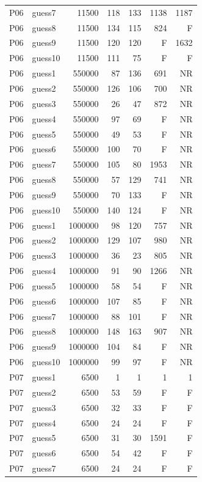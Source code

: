 {\begin{longtable}{llrrrrr}
P06 & guess7 & 11500 & 118 & 133 & 1138 & 1187 \\
P06 & guess8 & 11500 & 134 & 115 & 824 & F \\
P06 & guess9 & 11500 & 120 & 120 & F & 1632 \\
P06 & guess10 & 11500 & 111 & 75 & F & F \\
P06 & guess1 & 550000 & 87 & 136 & 691 & NR \\
P06 & guess2 & 550000 & 126 & 106 & 700 & NR \\
P06 & guess3 & 550000 & 26 & 47 & 872 & NR \\
P06 & guess4 & 550000 & 97 & 69 & F & NR \\
P06 & guess5 & 550000 & 49 & 53 & F & NR \\
P06 & guess6 & 550000 & 100 & 70 & F & NR \\
P06 & guess7 & 550000 & 105 & 80 & 1953 & NR \\
P06 & guess8 & 550000 & 57 & 129 & 741 & NR \\
P06 & guess9 & 550000 & 70 & 133 & F & NR \\
P06 & guess10 & 550000 & 140 & 124 & F & NR \\
P06 & guess1 & 1000000 & 98 & 120 & 757 & NR \\
P06 & guess2 & 1000000 & 129 & 107 & 980 & NR \\
P06 & guess3 & 1000000 & 36 & 23 & 805 & NR \\
P06 & guess4 & 1000000 & 91 & 90 & 1266 & NR \\
P06 & guess5 & 1000000 & 58 & 54 & F & NR \\
P06 & guess6 & 1000000 & 107 & 85 & F & NR \\
P06 & guess7 & 1000000 & 88 & 101 & F & NR \\
P06 & guess8 & 1000000 & 148 & 163 & 907 & NR \\
P06 & guess9 & 1000000 & 104 & 84 & F & NR \\
P06 & guess10 & 1000000 & 99 & 97 & F & NR \\
P07 & guess1 & 6500 & 1 & 1 & 1 & 1 \\
P07 & guess2 & 6500 & 53 & 59 & F & F \\
P07 & guess3 & 6500 & 32 & 33 & F & F \\
P07 & guess4 & 6500 & 24 & 24 & F & F \\
P07 & guess5 & 6500 & 31 & 30 & 1591 & F \\
P07 & guess6 & 6500 & 54 & 42 & F & F \\
P07 & guess7 & 6500 & 24 & 24 & F & F \\

\end{longtable}}
